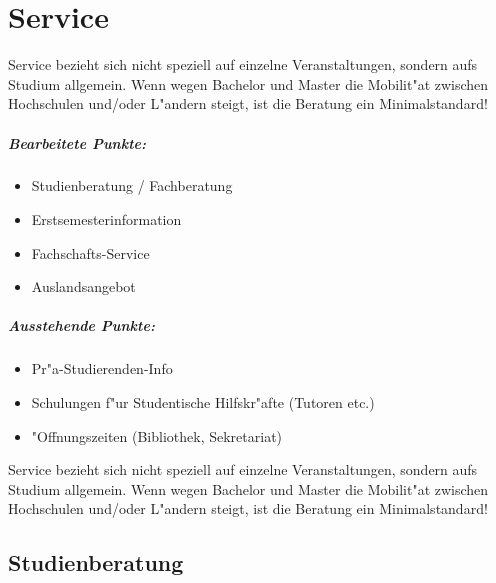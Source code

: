 \chapter{Service}
\thispagestyle{fancy}
\label{l.service}

\begin{kcmt62}
\begin{komacmt62}
	Service bezieht sich nicht speziell auf einzelne Veranstaltungen, sondern
	aufs Studium allgemein. Wenn wegen Bachelor und Master die Mobilit"at
	zwischen Hochschulen und/oder L"andern steigt, ist die Beratung ein
	Minimalstandard!

\end{komacmt62}
\end{kcmt62}
\begin{kcmt}\begin{komacmt}
	\paragraph{Bearbeitete Punkte:}
	\begin{itemize}
		\item Studienberatung / Fachberatung
		\item Erstsemesterinformation
		\item Fachschafts-Service
		\item Auslandsangebot
	\end{itemize}

	\paragraph{Ausstehende Punkte:}
	\begin{itemize}
		\item Pr"a-Studierenden-Info
		\item Schulungen f"ur Studentische Hilfskr"afte (Tutoren etc.)
		\item "Offnungszeiten (Bibliothek, Sekretariat)
	\end{itemize}

	Service bezieht sich nicht speziell auf einzelne Veranstaltungen, sondern
	aufs Studium allgemein. Wenn wegen Bachelor und Master die Mobilit"at
	zwischen Hochschulen und/oder L"andern steigt, ist die Beratung ein
	Minimalstandard!
\end{komacmt}\end{kcmt}

\section{Studienberatung}

